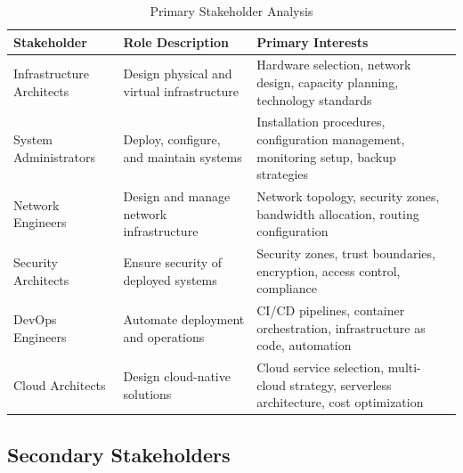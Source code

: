 \documentclass[11pt,letterpaper]{article}
\begin{document}
\begin{table}[H]
\centering
\caption{Primary Stakeholder Analysis}
\small
\begin{tabular}{@{}L{3.5cm}L{3.7cm}L{\dimexpr\linewidth-7.2cm-4\tabcolsep\relax}@{}}
\toprule
\textbf{Stakeholder} & \textbf{Role Description} & \textbf{Primary Interests} \\
\midrule
Infrastructure Architects & Design physical and virtual infrastructure & Hardware selection, network design, capacity planning, technology standards \\
\addlinespace
System Administrators & Deploy, configure, and maintain systems & Installation procedures, configuration management, monitoring setup, backup strategies \\
\addlinespace
Network Engineers & Design and manage network infrastructure & Network topology, security zones, bandwidth allocation, routing configuration \\
\addlinespace
Security Architects & Ensure security of deployed systems & Security zones, trust boundaries, encryption, access control, compliance \\
\addlinespace
DevOps Engineers & Automate deployment and operations & CI/CD pipelines, container orchestration, infrastructure as code, automation \\
\addlinespace
Cloud Architects & Design cloud-native solutions & Cloud service selection, multi-cloud strategy, serverless architecture, cost optimization \\
\bottomrule
\end{tabular}
\end{table}

\subsection{Secondary Stakeholders}
\end{document}
